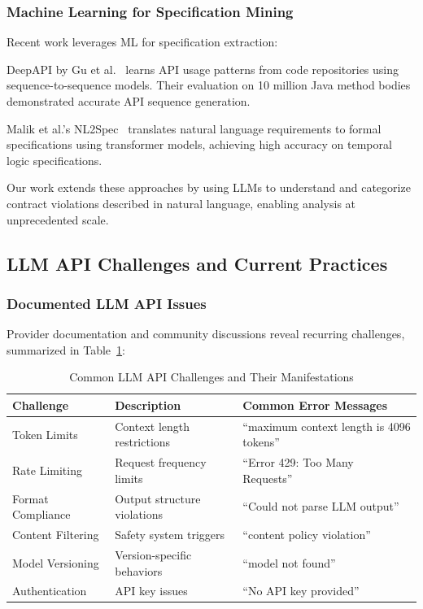 \documentclass[11pt]{article}
\begin{document}
\subsubsection{Machine Learning for Specification Mining}
Recent work leverages ML for specification extraction:

DeepAPI by Gu et al.~\cite{gu2016deep} learns API usage patterns from code repositories using sequence-to-sequence models. Their evaluation on 10 million Java method bodies demonstrated accurate API sequence generation.

Malik et al.'s NL2Spec~\cite{hahn2023nl2spec} translates natural language requirements to formal specifications using transformer models, achieving high accuracy on temporal logic specifications.

Our work extends these approaches by using LLMs to understand and categorize contract violations described in natural language, enabling analysis at unprecedented scale.

\subsection{LLM API Challenges and Current Practices}

\subsubsection{Documented LLM API Issues}
Provider documentation and community discussions reveal recurring challenges, summarized in Table~\ref{tab:llm_challenges}:

\begin{table}[h]
\centering
\caption{Common LLM API Challenges and Their Manifestations}
\label{tab:llm_challenges}
\begin{tabular}{p{3.5cm}p{5.5cm}p{5cm}}
\toprule
\textbf{Challenge} & \textbf{Description} & \textbf{Common Error Messages} \\
\midrule
Token Limits & Context length restrictions & ``maximum context length is 4096 tokens''~\cite{stackoverflow75396481} \\
Rate Limiting & Request frequency limits & ``Error 429: Too Many Requests''~\cite{stackoverflow75041580} \\
Format Compliance & Output structure violations & ``Could not parse LLM output''~\cite{githublangchain22103} \\
Content Filtering & Safety system triggers & ``content policy violation''~\cite{githubopenai331} \\
Model Versioning & Version-specific behaviors & ``model not found''~\cite{githubopenai926} \\
Authentication & API key issues & ``No API key provided''~\cite{stackoverflow76796341} \\
\bottomrule
\end{tabular}
\end{table}
\end{document}
